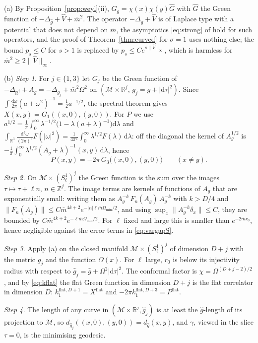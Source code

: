 \documentclass[11pt,a4paper]{article}
\makeatletter
\theoremstyle{stmt}
\theoremstyle{defn}
\theoremstyle{rmk}
\renewenvironment{proof}[1][\proofname]{\par\pushQED{\qed}\normalfont\topsep6\p@\@plus6\p@\relax
  \trivlist\item[\hskip\labelsep{\sffamily\itshape\small #1.}]\ignorespaces}{\popQED\endtrivlist\@endpefalse}
\numberwithin{equation}{section}
\newcommand{\M}{\mathcal{M}}
\newcommand{\R}{\mathbb{R}}
\newcommand{\dd}{\mathrm{d}}
\makeatother
\begin{document}
\begin{proof}
(a) By Proposition~\ref{prop:weyl}(ii), $G_g=\chi(x)\chi(y)\hat G$ with $\hat G$ the Green function of $-\Delta_{\hat g}+\hat V+\bar m^2$. The operator $-\Delta_{\hat g}+\hat V$ is of Laplace type with a potential that does not depend on $\bar m$, the asymptotics \eqref{eq:strong} of \cite{Ludewig} hold for such operators, and the proof of Theorem~\ref{thm:curved} for $\sigma=1$ uses nothing else; the bound $p_s\le C$ for $s>1$ is replaced by $p_s\le Ce^{s\|\hat V\|_\infty}$, which is harmless for $\bar m^2\ge2\|\hat V\|_\infty$.

(b) \emph{Step 1.} For $j\in\{1,3\}$ let $G_j$ be the Green function of $-\Delta_{\R^j}+A_g=-\Delta_{g_j}+\bar m^2\Omega^2$ on $(\M\times\R^j,\,g_j=g+|\dd\tau|^2)$. Since $\int\frac{\dd\omega}{2\pi}(a+\omega^2)^{-1}=\tfrac12a^{-1/2}$, the spectral theorem gives $X(x,y)=G_1((x,0),(y,0))$. For $P$ we use $a^{1/2}=\tfrac1\pi\int_0^\infty\lambda^{-1/2}\big(1-\lambda(a+\lambda)^{-1}\big)\dd\lambda$ and $\int_{\R^3}\frac{\dd^3\omega}{(2\pi)^3}F(|\omega|^2)=\tfrac1{4\pi^2}\int_0^\infty\lambda^{1/2}F(\lambda)\,\dd\lambda$: off the diagonal the kernel of $A_g^{1/2}$ is $-\tfrac1\pi\int_0^\infty\lambda^{1/2}(A_g+\lambda)^{-1}(x,y)\,\dd\lambda$, hence
\[
P(x,y)=-2\pi\,G_3\big((x,0),(y,0)\big)\qquad(x\ne y).
\]

\emph{Step 2.} On $\M\times(S^1_\ell)^j$ the Green function is the sum over the images $\tau\mapsto\tau+\ell n$, $n\in\mathbb Z^j$. The image terms are kernels of functions of $A_g$ that are exponentially small: writing them as $A_g^{-k}\,F_n(A_g)\,A_g^{-k}$ with $k>D/4$ and $\|F_n(A_g)\|\le C\bar m^{4k+2}e^{-|n|\ell\bar m\Omega_{\min}/2}$, and using $\sup_x\|A_g^{-k}\delta_x\|\le C$, they are bounded by $C\bar m^{4k+2}e^{-\ell\bar m\Omega_{\min}/2}$. For $\ell$ fixed and large this is smaller than $e^{-2\bar mr_0}$, hence negligible against the error terms in \eqref{eq:vargapS}.

\emph{Step 3.} Apply (a) on the closed manifold $\M\times(S^1_\ell)^j$ of dimension $D+j$ with the metric $g_j$ and the function $\Omega(x)$. For $\ell$ large, $r_0$ is below its injectivity radius with respect to $\hat g_j=\hat g+\Omega^2|\dd\tau|^2$. The conformal factor is $\chi=\Omega^{(D+j-2)/2}$, and by \eqref{eq:kflat} the flat Green function in dimension $D+j$ is the flat correlator in dimension $D$: $k_1^{\mathrm{flat},D+1}=X^{\mathrm{flat}}$ and $-2\pi k_1^{\mathrm{flat},D+3}=P^{\mathrm{flat}}$.

\emph{Step 4.} The length of any curve in $(\M\times\R^j,\hat g_j)$ is at least the $\hat g$-length of its projection to $\M$, so $d_{\hat g_j}((x,0),(y,0))=d_{\hat g}(x,y)$, and $\gamma$, viewed in the slice $\tau=0$, is the minimising geodesic.


\end{proof}
\end{document}
